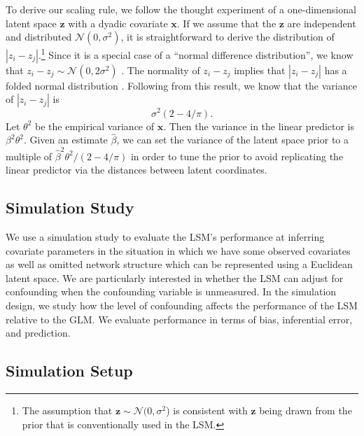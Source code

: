\documentclass[11pt]{article}
\begin{document}
To derive our scaling rule, we follow the thought experiment of a one-dimensional latent space $\mathbf{z}$ with a dyadic covariate $\mathbf{x}$. If we assume that the $\mathbf{z}$ are independent and distributed $\mathcal{N}(0,\sigma^2)$, it is straightforward to derive the distribution of $|z_i - z_j|$.\footnote{The assumption that $\mathbf{z} \sim \mathcal{N}(0,\sigma^2$) is consistent with $\mathbf{z}$ being drawn from the prior that is conventionally used in the LSM.} Since it is a special case of a ``normal difference distribution'', we know that $z_i - z_j \sim \mathcal{N}(0,2\sigma^2)$ \citep{devore2012}. The normality of $z_i - z_j$ implies that $|z_i - z_j|$ has a folded normal distribution \citep{leone1961}. Following from this result, we know that the variance of  $|z_i - z_j|$ is $$\sigma^2(2-4/\pi). $$ Let $\theta^2$ be the empirical variance of $\mathbf{x}$. Then the variance in the linear predictor is $\beta^2\theta^2$. Given an estimate $\hat{\beta}$, we can set the variance of the latent space prior to a multiple of $\hat{\beta}^2\theta^2/(2-4/\pi)$ in order to tune the prior to avoid replicating the linear predictor via the distances between latent coordinates. 

\subsection{Simulation Study}

We use a simulation study to evaluate the LSM's performance at inferring covariate parameters in the situation in which we have some observed covariates as well as omitted network structure which can be represented using a Euclidean latent space. We are particularly interested in whether the LSM can adjust for confounding when the confounding variable is unmeasured. In the simulation design, we study how the level of confounding affects the performance of the LSM relative to the GLM. We evaluate performance in terms of bias, inferential error, and prediction. 

\subsection{Simulation Setup}
\end{document}
